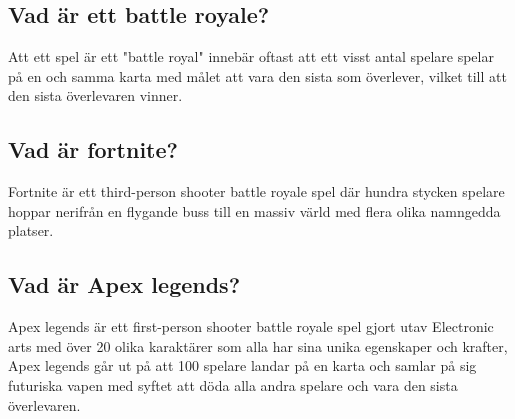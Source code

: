 \documentclass[11p]{article}
\begin{document}
\n

\subsection{Vad är ett battle royale?}
Att ett spel är ett "battle royal" innebär oftast att ett visst antal spelare spelar på en och samma karta med målet att vara den sista som överlever, vilket till att den sista överlevaren vinner.

\subsection{Vad är fortnite?}
Fortnite är ett third-person shooter battle royale spel där hundra stycken spelare hoppar nerifrån en flygande buss till en massiv värld med flera olika namngedda platser. \parencite{Fornite}

\subsection{Vad är Apex legends?}
Apex legends är ett first-person shooter battle royale spel gjort utav Electronic arts med över 20 olika karaktärer som alla har sina unika egenskaper och krafter, Apex legends går ut på att 100 spelare landar på en karta och samlar på sig futuriska vapen med syftet att döda alla andra spelare och vara den sista överlevaren.     \parencite{Apex}




\printbibliography
\end{document}
